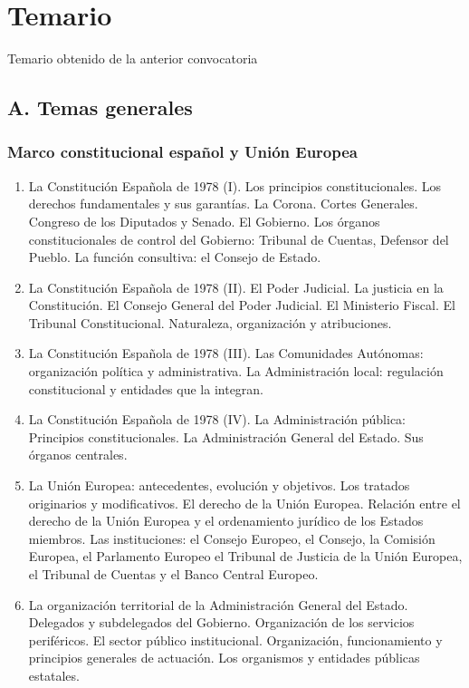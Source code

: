 \section{Temario}
Temario obtenido de la anterior convocatoria

\renewcommand{\thesubsubsection}{\thesubsection.\Roman{subsubsection}}
\subsection{A. Temas generales}
	\subsubsection{Marco constitucional español y Unión Europea}
	\begin{enumerate}
		\item La Constitución Española de 1978 (I). Los principios constitucionales. Los derechos fundamentales y sus garantías. La Corona. Cortes Generales. Congreso de los Diputados y Senado. El Gobierno. Los órganos constitucionales de control del Gobierno: Tribunal de Cuentas, Defensor del Pueblo. La función consultiva: el Consejo de Estado.
		\item La Constitución Española de 1978 (II). El Poder Judicial. La justicia en la Constitución. El Consejo General del Poder Judicial. El Ministerio Fiscal. El Tribunal Constitucional. Naturaleza, organización y atribuciones. 
		\item La Constitución Española de 1978 (III). Las Comunidades Autónomas: organización política y administrativa. La Administración local: regulación constitucional y entidades que la integran.
		\item La Constitución Española de 1978 (IV). La Administración pública: Principios constitucionales. La Administración General del Estado. Sus órganos centrales. 
		\item La Unión Europea: antecedentes, evolución y objetivos. Los tratados originarios y modificativos. El derecho de la Unión Europea. Relación entre el derecho de la Unión Europea y el ordenamiento jurídico de los Estados miembros. Las instituciones: el Consejo Europeo, el Consejo, la Comisión Europea, el Parlamento Europeo el Tribunal de Justicia de la Unión Europea, el Tribunal de Cuentas y el Banco Central Europeo.
		\item La organización territorial de la Administración General del Estado. Delegados y subdelegados del Gobierno. Organización de los servicios periféricos. El sector público institucional. Organización, funcionamiento y principios generales de actuación. Los organismos y entidades públicas estatales. 
	\end{enumerate}
